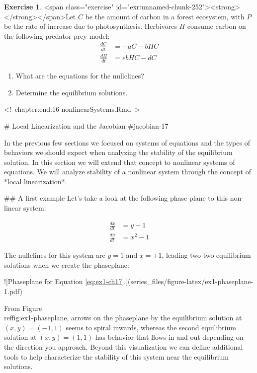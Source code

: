 \documentclass[
]{book}
\theoremstyle{definition}
\theoremstyle{definition}
\theoremstyle{definition}
\newtheorem{exercise}{Exercise}[chapter]
\theoremstyle{remark}
\begin{document}
\begin{exercise}
<span class="exercise" id="exr:unnamed-chunk-252"><strong>\label{exr:unnamed-chunk-252} </strong></span>Let $C$ be the amount of carbon in a forest ecosystem, with $P$ be the rate of increase due to photosynthesis.  Herbivores $H$ consume carbon on the following predator-prey model:
    \begin{align*}
\frac{dC}{dt}&=- aC - bHC \\
\frac{dH}{dt} &= ebHC-dC
\end{align*}

\begin{enumerate}
\item What are the equations for the nullclines?
\item Determine the equilibrium solutions.
\end{enumerate}
\end{exercise}





<!--chapter:end:16-nonlinearSystems.Rmd-->

# Local Linearization and the Jacobian {#jacobian-17}

In the previous few sections we focused on systems of equations and the types of behaviors we should expect when analyzing the stability of the equilibrium solution.  In this section we will extend that concept to nonlinear systems of equations.  We will analyze stability of a nonlinear system through the concept of *local linearization*.

## A first example
Let's take a look at the following phase plane to this non-linear system:

\begin{equation}
\begin{split} 
\frac{dx}{dt} &= y-1 \\  \label{eq:ex1-ch17}
\frac{dy}{dt} &= x^{2}-1 
\end{split}
\end{equation}

The nullclines for this system are $y=1$ and $x=\pm1$, leading two two equilibrium solutions when we create the phaseplane:

![\label{fig:ex1-phaseplane}Phaseplane for Equation \ref{eq:ex1-ch17}.](series_files/figure-latex/ex1-phaseplane-1.pdf) 

From Figure \\ref{fig:ex1-phaseplane}, arrows on the phaseplane by the equilibrium solution at $(x,y)=(-1,1)$ seems to spiral inwards, whereas the second equilibrium solution at $(x,y)=(1,1)$ has behavior that flows in and out depending on the direction you approach.  Beyond this visualization we can define additional tools to help characterize the stability of this system near the equilibrium solutions. 
\end{document}
